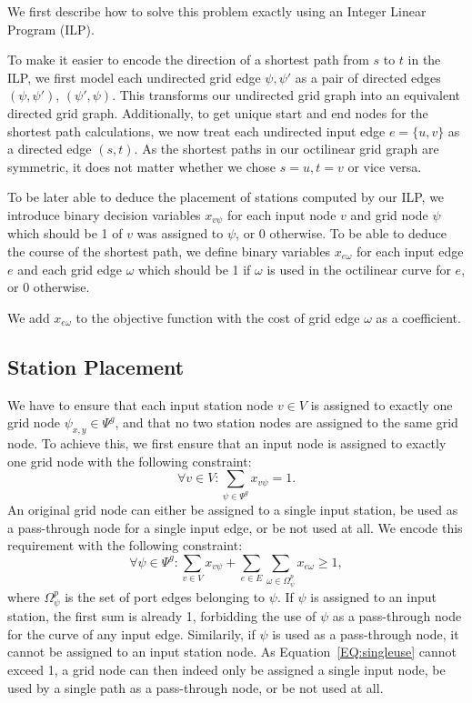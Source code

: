 \documentclass{sig-alternate-sigmod09}
\begin{document}
We first describe how to solve this problem exactly using an Integer Linear Program (ILP).

To make it easier to encode the direction of a shortest path from $s$ to $t$ in the ILP, we first model each undirected grid edge ${\psi, \psi'}$ as a pair of directed edges $(\psi, \psi')$, $(\psi', \psi)$.
This transforms our undirected grid graph into an equivalent directed grid graph.
Additionally, to get unique start and end nodes for the shortest path calculations, we now treat each undirected input edge $e = \{u, v\}$ as a directed edge $(s, t)$.
As the shortest paths in our octilinear grid graph are symmetric, it does not matter whether we chose $s = u, t = v$ or vice versa.

To be later able to deduce the placement of stations computed by our ILP, we introduce binary decision variables $x_{v\psi}$ for each input node $v$ and grid node $\psi$ which should be 1 of $v$ was assigned to $\psi$, or 0 otherwise.
To be able to deduce the course of the shortest path, we define binary variables $x_{e\omega}$ for each input edge $e$ and each grid edge $\omega$ which should be 1 if $\omega$ is used in the octilinear curve for $e$, or 0 otherwise.

We add $x_{e\omega}$ to the objective function with the cost of grid edge $\omega$ as a coefficient.

\subsection{Station Placement}

We have to ensure that each input station node $v \in V$ is assigned to exactly one grid node $\psi_{x, y} \in \Psi^g$, and that no two station nodes are assigned to the same grid node.
To achieve this, we first ensure that an input node is assigned to exactly one grid node with the following constraint:
%
\begin{equation}
  \forall v \in V: \sum_{\psi \in \Psi^g} x_{v\psi} = 1. \label{EQ:todo}
\end{equation}
%
An original grid node can either be assigned to a single input station, be used as a pass-through node for a single input edge, or be not used at all.
We encode this requirement with the following constraint:
%
\begin{equation}
  \forall \psi \in \Psi^g: \sum_{v \in V} x_{v\psi} + \sum_{e \in E} \sum_{\omega \in \Omega^p_\psi} x_{e\omega} \geq 1, \label{EQ:singleuse}
\end{equation}
%
where $\Omega^p_\psi$ is the set of port edges belonging to $\psi$. 
If $\psi$ is assigned to an input station, the first sum is already 1, forbidding the use of $\psi$ as a pass-through node for the curve of any input edge.
Similarily, if $\psi$ is used as a pass-through node, it cannot be assigned to an input station node.
As Equation~\ref{EQ:singleuse} cannot exceed 1, a grid node can then indeed only be assigned a single input node, be used by a single path as a pass-through node, or be not used at all.
\end{document}
